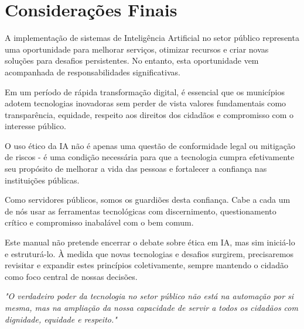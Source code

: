 \documentclass[12pt,a4paper]{article}
\begin{document}
\section{Considerações Finais}

A implementação de sistemas de Inteligência Artificial no setor público representa uma oportunidade para melhorar serviços, otimizar recursos e criar novas soluções para desafios persistentes. No entanto, esta oportunidade vem acompanhada de responsabilidades significativas.

Em um período de rápida transformação digital, é essencial que os municípios adotem tecnologias inovadoras sem perder de vista valores fundamentais como transparência, equidade, respeito aos direitos dos cidadãos e compromisso com o interesse público.

O uso ético da IA não é apenas uma questão de conformidade legal ou mitigação de riscos - é uma condição necessária para que a tecnologia cumpra efetivamente seu propósito de melhorar a vida das pessoas e fortalecer a confiança nas instituições públicas.

Como servidores públicos, somos os guardiões desta confiança. Cabe a cada um de nós usar as ferramentas tecnológicas com discernimento, questionamento crítico e compromisso inabalável com o bem comum.

Este manual não pretende encerrar o debate sobre ética em IA, mas sim iniciá-lo e estruturá-lo. À medida que novas tecnologias e desafios surgirem, precisaremos revisitar e expandir estes princípios coletivamente, sempre mantendo o cidadão como foco central de nossas decisões.

\begin{center}
\emph{"O verdadeiro poder da tecnologia no setor público não está na automação por si mesma, mas na ampliação da nossa capacidade de servir a todos os cidadãos com dignidade, equidade e respeito."}
\end{center}
\end{document}

